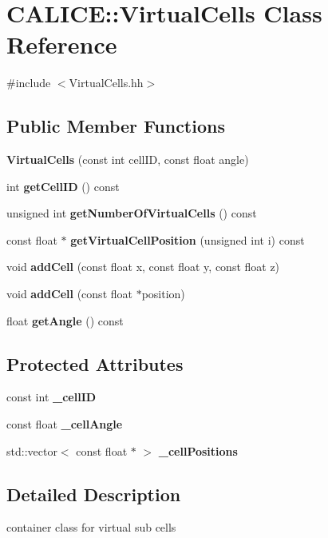 \section{C\-A\-L\-I\-C\-E\-:\-:Virtual\-Cells Class Reference}
\label{classCALICE_1_1VirtualCells}


{\ttfamily \#include $<$Virtual\-Cells.\-hh$>$}

\subsection*{Public Member Functions}
\begin{DoxyCompactItemize}
\item 
{\bf Virtual\-Cells} (const int cell\-I\-D, const float angle)
\item 
int {\bf get\-Cell\-I\-D} () const 
\item 
unsigned int {\bf get\-Number\-Of\-Virtual\-Cells} () const 
\item 
const float $\ast$ {\bf get\-Virtual\-Cell\-Position} (unsigned int i) const 
\item 
void {\bf add\-Cell} (const float x, const float y, const float z)
\item 
void {\bf add\-Cell} (const float $\ast$position)
\item 
float {\bf get\-Angle} () const 
\end{DoxyCompactItemize}
\subsection*{Protected Attributes}
\begin{DoxyCompactItemize}
\item 
const int {\bfseries \-\_\-cell\-I\-D}\label{classCALICE_1_1VirtualCells_afa83be29e6de5c242fc8a90fff8dde5c}

\item 
const float {\bfseries \-\_\-cell\-Angle}\label{classCALICE_1_1VirtualCells_a4c57922d6b47ce4dece4d7bf6657720e}

\item 
std\-::vector$<$ const float $\ast$ $>$ {\bfseries \-\_\-cell\-Positions}\label{classCALICE_1_1VirtualCells_a939247ffe329c15b1a6530fc48407c83}

\end{DoxyCompactItemize}


\subsection{Detailed Description}
container class for virtual sub cells

